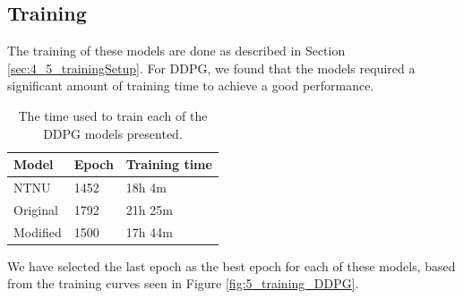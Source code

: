\subsection{Training}
\label{sec:5_ddpg_training}
The training of these models are done as described in Section \ref{sec:4_5_trainingSetup}. For DDPG, we found that the models required a significant amount of training time to achieve a good performance.
\begin{table}[hbt]
    \centering
    \begin{tabular}{||M{3cm}|M{3cm}|M{4cm}||}
    \hline
    \centering
    Model & Epoch & Training time \\ \hline\hline
    NTNU     & 1452 & 18h 4m  \\ \hline
    Original & 1792 & 21h 25m \\ \hline
    Modified & 1500 & 17h 44m \\ \hline
    \end{tabular}
    \caption{The time used to train each of the DDPG models presented.}
     \label{table:5_trainingTime_DDPG}
\end{table}
We have selected the last epoch as the best epoch for each of these models, based from the training curves seen in Figure \ref{fig:5_training_DDPG}.
